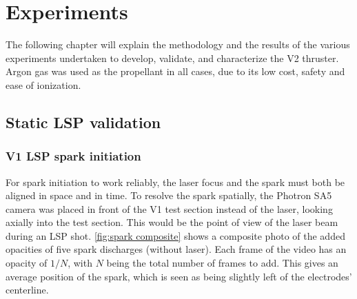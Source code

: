 \chapter{Experiments}

    The following chapter will explain the methodology and the results of the various experiments undertaken to develop, validate, and characterize the V2 thruster. Argon gas was used as the propellant in all cases, due to its low cost, safety and ease of ionization.

    \section{Static LSP validation}

        \subsection{V1 LSP spark initiation}

            For spark initiation to work reliably, the laser focus and the spark must both be aligned in space and in time. To resolve the spark spatially, the Photron SA5 camera was placed in front of the V1 test section instead of the laser, looking axially into the test section. This would be the point of view of the laser beam during an LSP shot. \autoref{fig:spark composite} shows a composite photo of the added opacities of five spark discharges (without laser). Each frame of the video has an opacity of $1/N$, with $N$ being the total number of frames to add. This gives an average position of the spark, which is seen as being slightly left of the electrodes' centerline.

